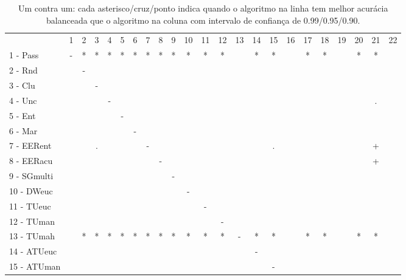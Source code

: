 \begin{table}[h]
\caption{Um contra um: cada asterisco/cruz/ponto indica quando o algoritmo na linha tem melhor acurácia balanceada que o algoritmo na coluna com intervalo de confiança de 0.99/0.95/0.90.}
\begin{center}
\begin{tabular}{lcc|cc|cc|cc|cc|cc|cc|cc|cc|cc|cc}
 			& 1 & 2 & 3 & 4 & 5 & 6 & 7 & 8 & 9 & 10 & 11 & 12 & 13 & 14 & 15 & 16 & 17 & 18 & 19 & 20 & 21 & 22\\
1 - Pass 	& - & * & * & * & * & * & * & * & * & * & * & * &   & * & * &   & * & * &   & * & * &   \\
2 - Rnd  	&   & - &   &   &   &   &   &   &   &   &   &   &   &   &   &   &   &   &   &   &   &   \\ \hline
3 - Clu  	&   &   & - &   &   &   &   &   &   &   &   &   &   &   &   &   &   &   &   &   &   &   \\
4 - Unc  	&   &   &   & - &   &   &   &   &   &   &   &   &   &   &   &   &   &   &   &   & . &   \\ \hline
5 - Ent  	&   &   &   &   & - &   &   &   &   &   &   &   &   &   &   &   &   &   &   &   &   &   \\
6 - Mar  	&   &   &   &   &   & - &   &   &   &   &   &   &   &   &   &   &   &   &   &   &   &   \\ \hline
7 - EERent	&   &   & . &   &   &   & - &   &   &   &   &   &   &   & . &   &   &   &   &   & + &   \\
8 - EERacu	&   &   &   &   &   &   &   & - &   &   &   &   &   &   &   &   &   &   &   &   & + &   \\ \hline
9 - SGmulti	&   &   &   &   &   &   &   &   & - &   &   &   &   &   &   &   &   &   &   &   &   &   \\
10 - DWeuc	&   &   &   &   &   &   &   &   &   & - &   &   &   &   &   &   &   &   &   &   &   &   \\ \hline
11 - TUeuc	&   &   &   &   &   &   &   &   &   &   & - &   &   &   &   &   &   &   &   &   &   &   \\
12 - TUman	&   &   &   &   &   &   &   &   &   &   &   & - &   &   &   &   &   &   &   &   &   &   \\ \hline
13 - TUmah	&   & * & * & * & * & * & * & * & * & * & * & * & - & * & * &   & * & * &   & * & * &   \\
14 - ATUeuc	&   &   &   &   &   &   &   &   &   &   &   &   &   & - &   &   &   &   &   &   &   &   \\ \hline
15 - ATUman	&   &   &   &   &   &   &   &   &   &   &   &   &   &   & - &   &   &   &   &   &   &   \\

\end{tabular}
\end{center}
\end{table}

